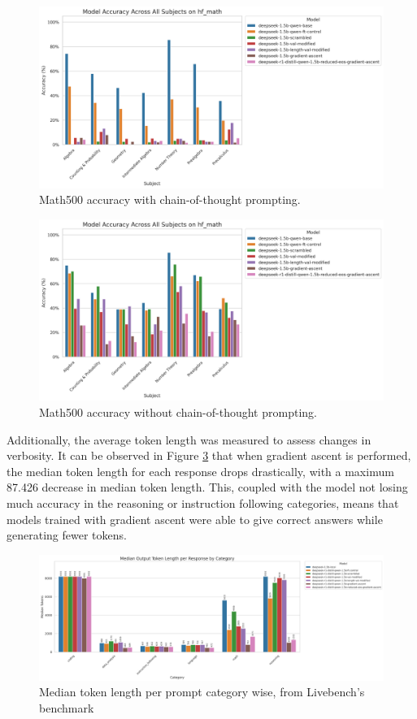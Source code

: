 \documentclass[10pt]{article}
\begin{document}
\begin{figure}[h]
    \centering
    \includegraphics[width=0.9\linewidth]{main_prompt_hf_math_accuracy_all_subjects_combined_20250505_042444.png}
    \caption{Math500 accuracy with chain-of-thought prompting.}
    \label{fig:math500_cot}
\end{figure}
\begin{figure}[h]
    \centering
    \includegraphics[width=0.9\linewidth]{new_prompt_hf_math_accuracy_all_subjects_combined_20250505_210815.png}
    \caption{Math500 accuracy without chain-of-thought prompting.}
    \label{fig:math500_no_cot}
\end{figure}

Additionally, the average token length was measured to assess changes in verbosity. It can be observed in Figure \ref{fig:token_length_median} that when gradient ascent is performed, the median token length for each response drops drastically, with a maximum 87.426 decrease in median token length. This, coupled with the model not losing much accuracy in the reasoning or instruction following categories, means that models trained with gradient ascent were able to give correct answers while generating fewer tokens.
\begin{figure}[h]
    \centering
    \includegraphics[width=1\linewidth]{token_length_median_by_category.png}
    \caption{Median token length per prompt category wise, from Livebench's benchmark}
    \label{fig:token_length_median}
\end{figure}
\end{document}
